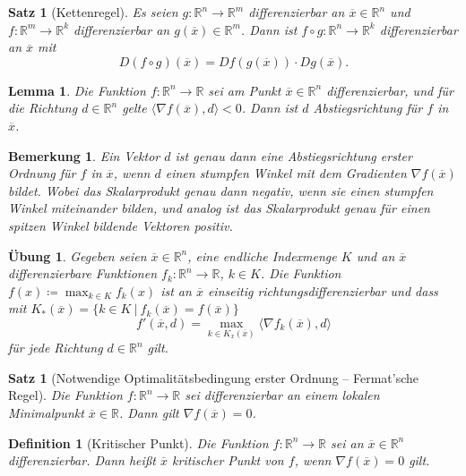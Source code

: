 \documentclass[11pt]{scrreprt}
\newcounter{thm}
\theoremstyle{thmstyle}
\numberwithin{thm}{section}
\newtheorem{bemerkung}[thm]{Bemerkung}
\newtheorem{definition}[thm]{Definition}
\newtheorem{lemma}[thm]{Lemma}
\newtheorem{satz}[thm]{Satz}
\newtheorem{uebung}[thm]{Übung}
\begin{document}
\begin{satz}[Kettenregel]
	Es seien $g \colon \mathbb{R}^n \rightarrow \mathbb{R}^m$ differenzierbar an $\overline{x} \in \mathbb{R}^n$ und $f \colon \mathbb{R}^m \rightarrow \mathbb{R}^k$ differenzierbar an $g(\overline{x}) \in \mathbb{R}^m$. Dann ist $f \circ g \colon \mathbb{R}^n \rightarrow \mathbb{R}^k$ differenzierbar an $\overline{x}$ mit
	$$ D( f \circ g )(\overline{x}) = D f( g(\overline{x}) ) \cdot D g(\overline{x}). $$
\end{satz}

\begin{lemma}
	Die Funktion $f \colon \mathbb{R}^n \rightarrow \mathbb{R}$ sei am Punkt $\overline{x} \in \mathbb{R}^n$ differenzierbar, und für die Richtung $d \in \mathbb{R}^n$ gelte $\langle \nabla f(\overline{x}), d \rangle < 0$. Dann ist $d$ Abstiegsrichtung für $f$ in $\overline{x}$.
\end{lemma}

\begin{bemerkung}
	Ein Vektor $d$ ist genau dann eine Abstiegsrichtung erster Ordnung für $f$ in $\overline{x}$, wenn $d$ einen stumpfen Winkel mit dem Gradienten $\nabla f(\overline{x})$ bildet. Wobei das Skalarprodukt genau dann negativ, wenn sie einen stumpfen Winkel miteinander bilden, und analog ist das Skalarprodukt genau für einen spitzen Winkel bildende Vektoren positiv.	
\end{bemerkung}

\begin{uebung}
	Gegeben seien $\overline{x} \in \mathbb{R}^n$, eine endliche Indexmenge $K$ und an $\overline{x}$ differenzierbare Funktionen $f_k \colon \mathbb{R}^n\rightarrow \mathbb{R}$, $k \in K$. Die Funktion $f(x) \coloneqq \max_{k \in K} f_k(x)$ ist an $\overline{x}$ einseitig richtungsdifferenzierbar und dass mit $K_*(\overline{x}) = \{ k \in K ~|~f_k(\overline{x}) = f(\overline{x}) \}$
	$$ f'(\overline{x}, d) = \max_{k \in K_x(\overline{x})} \langle \nabla f_k(\overline{x}), d \rangle $$
	für jede Richtung $d \in \mathbb{R}^n$ gilt.
\end{uebung}

\begin{satz}[Notwendige Optimalitätsbedingung erster Ordnung – Fermat'sche Regel]
	Die Funktion $f \colon \mathbb{R}^n \rightarrow \mathbb{R}$ sei differenzierbar an einem lokalen Minimalpunkt $\overline{x} \in \mathbb{R}$. Dann gilt $\nabla f(\overline{x}) = 0$.
\end{satz}

\begin{definition}[Kritischer Punkt]
	Die Funktion $f \colon \mathbb{R}^n \rightarrow \mathbb{R}$ sei an $\overline{x} \in \mathbb{R}^n$ differenzierbar. Dann heißt $\overline{x}$ kritischer Punkt von $f$, wenn $\nabla f(\overline{x}) = 0$ gilt.
\end{definition}
\end{document}
